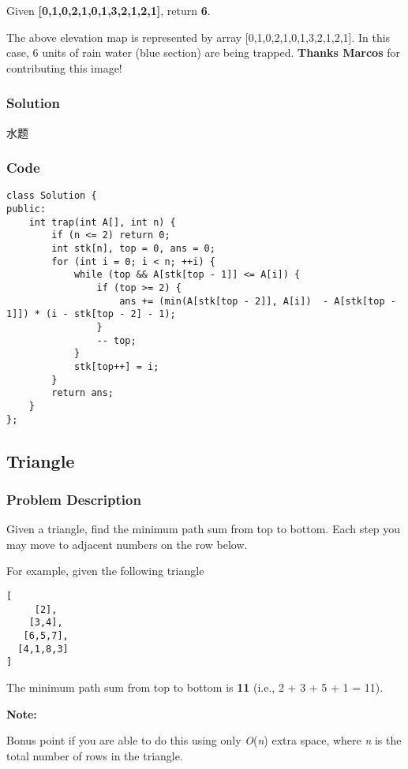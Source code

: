 \documentclass[courier]{article}
\begin{document}
\begin{CJK*}{UTF8}{gkai}
Given \textbf{[0,1,0,2,1,0,1,3,2,1,2,1]}, return \textbf{6}.

The above elevation map is represented by array [0,1,0,2,1,0,1,3,2,1,2,1]. In this case, 6 units of rain water (blue section) are being trapped. \textbf{Thanks Marcos} for contributing this image!



\subsubsection*{Solution}
水题

\subsubsection*{Code}
\begin{lstlisting}
class Solution {
public:
    int trap(int A[], int n) {
        if (n <= 2) return 0;
        int stk[n], top = 0, ans = 0;
        for (int i = 0; i < n; ++i) {
            while (top && A[stk[top - 1]] <= A[i]) {
                if (top >= 2) {
                    ans += (min(A[stk[top - 2]], A[i])  - A[stk[top - 1]]) * (i - stk[top - 2] - 1);
                }
                -- top;
            }
            stk[top++] = i;
        }
        return ans;
    }
}; 
\end{lstlisting}


\subsection{ Triangle }

\subsubsection*{Problem Description}
Given a triangle, find the minimum path sum from top to bottom. Each step you may move to adjacent numbers on the row below.

For example, given the following triangle


\begin{verbatim}
[
     [2],
    [3,4],
   [6,5,7],
  [4,1,8,3]
]
\end{verbatim}

The minimum path sum from top to bottom is \textbf{11} (i.e., 2 + 3 + 5 + 1 = 11).

\textbf{Note:}


Bonus point if you are able to do this using only \emph{O}(\emph{n}) extra space, where \emph{n} is the total number of rows in the triangle.




\end{CJK*}
\end{document}
